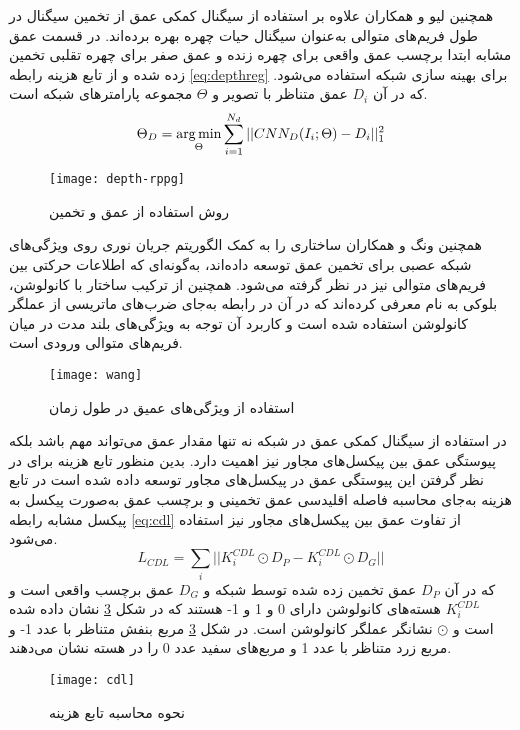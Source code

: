    همچنین لیو و همکاران
\cite{liu2018learning}
   علاوه بر استفاده از سیگنال کمکی عمق از تخمین سیگنال  در طول فریم‌های متوالی به‌عنوان سیگنال حیات چهره بهره برده‌اند. در قسمت عمق مشابه
\cite{atoum2017face}
   ابتدا برچسب عمق واقعی برای چهره زنده و عمق صفر برای چهره تقلبی تخمین زده شده و از تابع هزینه رابطه
\ref{eq:depthreg}
   برای بهینه سازی شبکه استفاده می‌شود. که در آن 
$D_i$
 عمق متناظر با تصویر و 
$\Theta$
مجموعه پارامتر‌های شبکه است.
\begin{equation}\label{eq:depthreg}
	\Theta_D = \operatorname*{arg\,min}_\Theta{\sum_{i=1}^{N_d}||CNN_D(I_i;\Theta)-D_i||^2_1} 
\end{equation}

\begin{figure}[t]
	\centerline{\texttt{[image: depth-rppg]}}
	\caption{روش استفاده از عمق و تخمین  \cite{liu2018learning}}
	\label{fig:depth-rppg}
\end{figure}

همچنین ونگ و همکاران
\cite{wang2018exploiting}
ساختاری را به کمک الگوریتم جریان نوری
 روی ویژگی‌های شبکه عصبی برای تخمین عمق توسعه داده‌اند، به‌گونه‌ای که اطلاعات حرکتی بین فریم‌های متوالی نیز در نظر گرفته می‌شود. همچنین از ترکیب ساختار
  \cite{cho2014learning}
با کانولوشن، بلوکی به نام  معرفی کرده‌اند که در آن در رابطه  به‌جای ضرب‌های ماتریسی از عملگر کانولوشن استفاده شده است و کاربرد آن توجه به ویژگی‌های بلند مدت در میان فریم‌های متوالی ورودی است.

\begin{figure}[h]
	\centerline{\texttt{[image: wang]}}
	\caption{استفاده از ویژگی‌های عمیق در طول زمان \cite{wang2018exploiting}}
	\label{fig:wang}
\end{figure}
در استفاده از سیگنال کمکی عمق در شبکه نه تنها مقدار عمق می‌تواند مهم باشد بلکه پیوستگی عمق بین پیکسل‌های مجاور نیز اهمیت دارد. بدین منظور تابع هزینه  برای در نظر گرفتن این پیوستگی عمق در پیکسل‌های مجاور توسعه داده شده است
\cite{wang2020deep,wang2018exploiting}
در تابع هزینه  به‌جای محاسبه فاصله اقلیدسی عمق تخمینی و برچسب عمق به‌صورت پیکسل به پیکسل مشابه رابطه
\ref{eq:cdl}
 از تفاوت عمق بین پیکسل‌های مجاور نیز استفاده می‌شود.
\begin{equation}\label{eq:cdl}
	L_{CDL} = \sum_{i}||K_i^{CDL} \odot D_P-K_i^{CDL} \odot D_G||
\end{equation}
که در آن
$D_P$
عمق تخمین زده شده توسط شبکه و
$D_G$
عمق برچسب واقعی است و
$K_i^{CDL}$
هسته‌های کانولوشن دارای 0 و 1 و 1- هستند که در شکل
\ref{fig:cdl}
نشان داده شده است و 
$\odot$
 نشانگر عملگر کانولوشن است. در شکل
\ref{fig:cdl}
مربع بنفش متناظر با عدد 1- و مربع زرد متناظر با عدد 1 و مربع‌های سفید عدد 0 را در هسته نشان می‌دهند. 
 \begin{figure}[h]
 	\centerline{\texttt{[image: cdl]}}
 	\caption{نحوه محاسبه تابع هزینه  \cite{yu2020searching}}
 	\label{fig:cdl}
 \end{figure}

